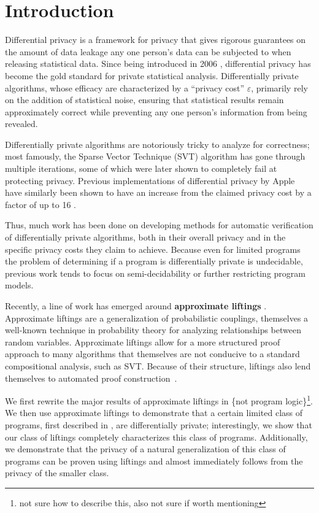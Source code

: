 \documentclass[12pt]{article}
\theoremstyle{definition}
\begin{document}
\section{Introduction}

Differential privacy is a framework for privacy that gives rigorous guarantees on the amount of data leakage any one person's data can be subjected to when releasing statistical data. Since being introduced in 2006 \cite{DP2006}, differential privacy has become the gold standard for private statistical analysis. 
Differentially private algorithms, whose efficacy are characterized by a ``privacy cost'' $\varepsilon$, primarily rely on the addition of statistical noise, ensuring that statistical results remain approximately correct while preventing any one person's information from being revealed. 

Differentially private algorithms are notoriously tricky to analyze for correctness; most famously, the Sparse Vector Technique (SVT) algorithm has gone through multiple iterations, some of which were later shown to completely fail at protecting privacy\cite{10.14778/3055330.3055331}. Previous implementations of differential privacy by Apple have similarly been shown to have an increase from the claimed privacy cost by a factor of up to 16 \cite{appleleakprivacy}. 

Thus, much work has been done on developing methods for automatic verification of differentially private algorithms, both in their overall privacy and in the specific privacy costs they claim to achieve. 
Because even for limited programs the problem of determining if a program is differentially private is undecidable\cite{barthe.etal2020decidingdp}, previous work tends to focus on semi-decidability or further restricting program models. 

Recently, a line of work has emerged around \textbf{approximate liftings} \cite{BartheEtAl2016,bartheKopfOlmedo2012ProbabilisticRelationalReasoningforDifferentialPriv,BartheOlmedo2013,HsuThesis2017}. Approximate liftings are a generalization of probabilistic couplings, themselves a well-known technique in probability theory for analyzing relationships between random variables. 
Approximate liftings allow for a more structured proof approach to many algorithms that themselves are not conducive to a standard compositional analysis, such as SVT. Because of their structure, liftings also lend themselves to automated proof construction~\cite{AlbarghouthiHsu2018}. 

We first rewrite the major results of approximate liftings in \{not program logic\}\footnote{not sure how to describe this, also not sure if worth mentioning}. 
We then use approximate liftings to demonstrate that a certain limited class of programs, first described in \cite{chadhaLinearTimeDecidability2021}, are differentially private; interestingly, we show that our class of liftings completely characterizes this class of programs. Additionally, we demonstrate that the privacy of a natural generalization of this class of programs can be proven using liftings and almost immediately follows from the privacy of the smaller class. 
\end{document}
